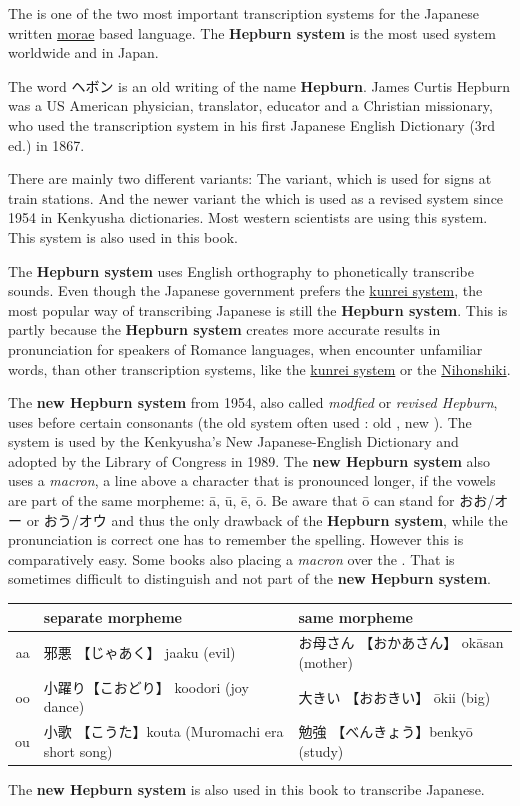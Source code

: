 The \lhepburnsystem{} is one of the two most important transcription systems
for the Japanese written \hyperref[sec:Mora]{morae} based language. The
\textbf{Hepburn system} is the most used system worldwide and in Japan.

The word {ヘボン}  is an old writing of the name \textbf{Hepburn}. James
Curtis Hepburn was a US American physician, translator, educator and a
Christian missionary, who used the transcription system in his first Japanese
English Dictionary (3rd ed.) in 1867.

There are mainly two different variants: The \loldhepburnsystem{} variant,
which is used for signs at train stations. And the newer variant the
\lnewhepburnsystem{} which is used as a revised system since 1954 in Kenkyusha
dictionaries. Most western scientists are using this system. This system is
also used in this book.

The \textbf{Hepburn system} uses English orthography to phonetically transcribe
sounds.  Even though the Japanese government prefers the
\hyperref[sec:Kunrei]{kunrei system}, the most popular way of transcribing
Japanese is still the \textbf{Hepburn system}. This is partly because the
\textbf{Hepburn system} creates more accurate results in pronunciation for
speakers of Romance languages, when encounter unfamiliar words, than other
transcription systems, like the \hyperref[sec:Kunrei]{kunrei system} or the
\hyperref[sec:Kunrei]{Nihonshiki}.

The \textbf{new Hepburn system} from 1954, also called \textit{modfied} or
\textit{revised Hepburn}, uses  before certain consonants (the old system
often used : old , new ). The system is used by the
Kenkyusha's New Japanese-English Dictionary and adopted by the Library of
Congress in 1989.  The \textbf{new Hepburn system} also uses a \textit{macron},
a line above a character that is pronounced longer, if the vowels are part of
the same morpheme: ā, ū, ē, ō. Be aware that ō can stand for おお/オー or
おう/オウ and thus the only drawback of the \textbf{Hepburn system}, while the
pronunciation is correct one has to remember the spelling. However this is
comparatively easy. Some books also placing a \textit{macron} over the .
That is sometimes difficult to distinguish and not part of the \textbf{new
Hepburn system}.\medskip

\begin{tabular}{r|l|l}
        &\textbf{separate morpheme}&\textbf{same morpheme}\\\hline
        aa&邪悪 【じゃあく】 jaaku (evil)& お母さん 【おかあさん】 okāsan (mother)\\
        oo&小躍り【こおどり】 koodori (joy dance)& 大きい 【おおきい】 ōkii (big)\\
        ou&小歌 【こうた】kouta (Muromachi era short song)& 勉強 【べんきょう】benkyō (study)\\
\end{tabular}
\medskip

The \textbf{new Hepburn system} is also used in this book to transcribe Japanese.


